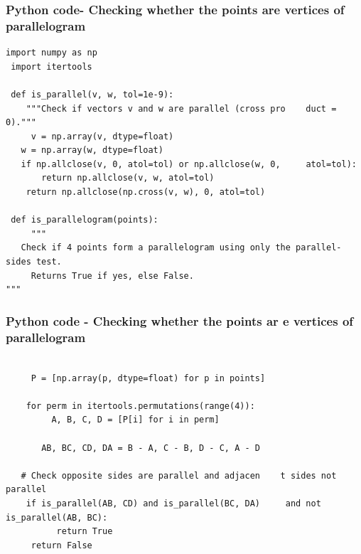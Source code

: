 \documentclass{beamer}
\begin{document}
\begin{frame}[fragile]
    \frametitle{Python code- Checking whether the points are vertices of parallelogram}
    \begin{lstlisting}
import numpy as np
 import itertools

 def is_parallel(v, w, tol=1e-9):
    """Check if vectors v and w are parallel (cross pro    duct = 0)."""
     v = np.array(v, dtype=float)
   w = np.array(w, dtype=float)
   if np.allclose(v, 0, atol=tol) or np.allclose(w, 0,     atol=tol):
       return np.allclose(v, w, atol=tol)
    return np.allclose(np.cross(v, w), 0, atol=tol)

 def is_parallelogram(points):
     """
   Check if 4 points form a parallelogram using only the parallel-sides test.
     Returns True if yes, else False.
"""
     \end{lstlisting}
\end{frame}

\begin{frame}[fragile]                            
	\frametitle{Python code - Checking whether the points ar    e vertices of parallelogram}                
	\begin{lstlisting}

     P = [np.array(p, dtype=float) for p in points]

    for perm in itertools.permutations(range(4)):
         A, B, C, D = [P[i] for i in perm]

       AB, BC, CD, DA = B - A, C - B, D - C, A - D

   # Check opposite sides are parallel and adjacen    t sides not parallel
    if is_parallel(AB, CD) and is_parallel(BC, DA)     and not is_parallel(AB, BC):
          return True
     return False
	\end{lstlisting}                            
\end{frame}
\end{document}
